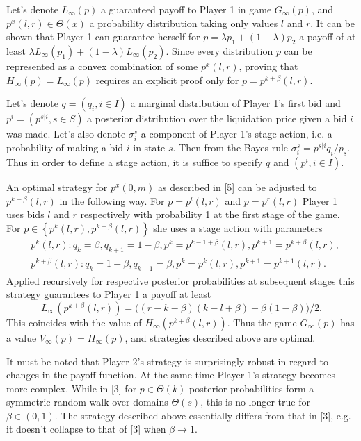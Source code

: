 Let's denote $L_\infty(p)$ a guaranteed payoff to Player 1 in game
$G_\infty(p)$, and $p^x(l, r) \in \Theta(x)$ a probability distribution taking
only values $l$ and $r$. It can be shown that Player 1 can guarantee herself for
$p = \lambda p_1 + (1-\lambda) p_2$ a payoff of at least $\lambda L_\infty(p_1)
+ (1-\lambda) L_\infty(p_2)$. Since every distribution $p$ can be represented as
a convex combination of some $p^x(l,r)$, proving that $H_\infty(p) =
L_\infty(p)$ requires an explicit proof only for $p = p^{k+\beta}(l, r)$.

Let's denote $q = (q_i, i \in I)$ a marginal distribution of Player 1's first
bid and $p^i = (p^{s|i}, s \in S)$ a posterior distribution over the liquidation
price given a bid $i$ was made. Let's also denote $\sigma^s_i$ a component of
Player 1's stage action, i.e. a probability of making a bid $i$ in state $s$.
Then from the Bayes rule $\sigma^s_i = p^{s|i} q_i / p_s$. Thus in order to
define a stage action, it is suffice to specify $q$ and $(p^i, i \in I)$.

An optimal strategy for $p^x(0, m)$ as described in [5] can be adjusted to
$p^{k+\beta}(l, r)$ in the following way. For $p = p^l(l, r)$ and $p = p^r(l,r)$
Player 1 uses bids $l$ and $r$ respectively with probability 1 at the first
stage of the game. For $p \in \left\{ p^k(l, r), p^{k+\beta}(l,r) \right\}$ she
uses a stage action with parameters
\begin{align*}
  &p^k(l,r):
    q_k = \beta,
    q_{k+1} = 1-\beta,
    p^k = p^{k-1+\beta}(l,r),
    p^{k+1} = p^{k+\beta}(l,r),\\
  &p^{k+\beta}(l,r):
    q_k = 1-\beta,
    q_{k+1} = \beta,
    p^k = p^k(l,r),
    p^{k+1} = p^{k+1}(l,r).
\end{align*}
Applied recursively for respective posterior probabilities at subsequent stages
this strategy guarantees to Player 1 a payoff at least
\begin{equation*}
  L_\infty\left(p^{k+\beta}(l, r)\right)
  = \bigl( (r - k - \beta)(k - l + \beta) + \beta(1-\beta) \bigr)/2.
\end{equation*}
This coincides with the value of $H_\infty\left(p^{k+\beta}(l, r)\right)$. Thus
the game $G_\infty(p)$ has a value $V_\infty(p) = H_\infty(p)$, and strategies
described above are optimal.

It must be noted that Player 2's strategy is surprisingly robust in regard to
changes in the payoff function. At the same time Player 1's strategy becomes
more complex. While in [3] for $p \in \Theta(k)$ posterior probabilities form a
symmetric random walk over domains $\Theta(s)$, this is no longer true for
$\beta \in (0, 1)$. The strategy described above essentially differs from that
in [3], e.g. it doesn't collapse to that of [3] when $\beta \rightarrow 1$.

